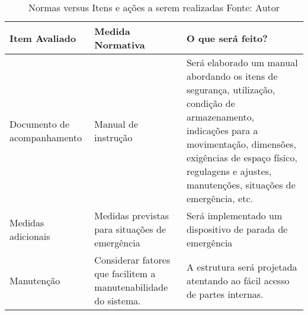     \begin{table}[!ht]
            \begin{center}
              \begin{tabular}{|p{5cm}|p{5cm}|p{5cm}|}
                \hline
                \textbf{Item Avaliado} & \textbf{Medida Normativa} & \textbf{O que será feito?}
                \\ \hline
                Documento de acompanhamento & Manual de instrução & Será elaborado um manual abordando os itens de segurança, utilização, condição de armazenamento, indicações para a movimentação, dimensões, exigências de espaço físico, regulagens e ajustes, manutenções, situações de emergência, etc.
                \\ \hline
                Medidas adicionais & Medidas previstas para situações de emergência & Será implementado um dispositivo de parada de emergência
                \\ \hline
                Manutenção & Considerar fatores que facilitem a manutenabilidade do sistema. & A estrutura será projetada atentando ao fácil acesso de partes internas.
                \\ \hline
              \end{tabular}
              \caption[Normas versus Itens e ações a serem realizadas]{Normas versus Itens e ações a serem realizadas
              \protect Fonte: Autor}
            \label{tabela_normas_2}
        \end{center}
    \end{table}
